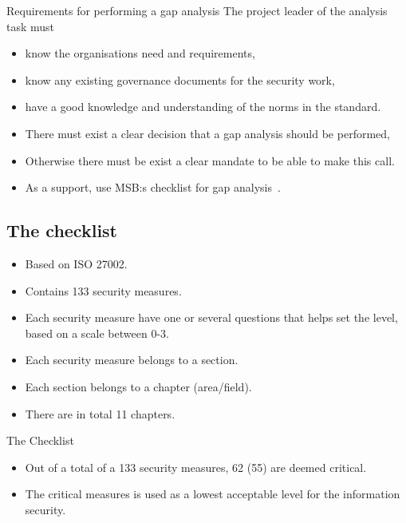 \documentclass{beamer}
\begin{document}
\begin{frame}{Requirements for performing a gap analysis}
  The project leader of the analysis task must
  \begin{itemize}
    \item know the organisations need and requirements,
    \item know any existing governance documents for the security work,
    \item have a good knowledge and understanding of the norms in the standard.
  \end{itemize}
\end{frame}

\begin{frame}
  \begin{itemize}
    \item There must exist a clear decision that a gap analysis should be
      performed,
    \item Otherwise there must be exist a clear mandate to be able to make this call.
    \item As a support, use MSB:s checklist for gap analysis~\cite{MSB2011gb}.
  \end{itemize}
\end{frame}

\subsection{The checklist}

\begin{frame}
  \begin{itemize}
    \item Based on ISO 27002.
    \item Contains 133 security measures.
    \item Each security measure have one or several questions that helps set the
      level, based on a scale between 0-3.
    \item Each security measure belongs to a section.
    \item Each section belongs to a chapter (area/field).
    \item There are in total 11 chapters.
  \end{itemize}
\end{frame}

\begin{frame}{The Checklist}
  \begin{itemize}
    \item Out of a total of a 133 security measures, 62 (55) are deemed critical.
    \item The critical measures is used as a lowest acceptable level for
      the information security.
  \end{itemize}
\end{frame}
\end{document}
